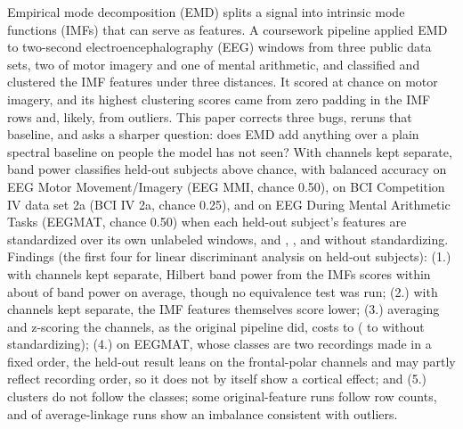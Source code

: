 Empirical mode decomposition (EMD) splits a signal into intrinsic mode functions (IMFs) that can serve as features. A coursework pipeline applied EMD to two-second electroencephalography (EEG) windows from three public data sets, two of motor imagery and one of mental arithmetic, and classified and clustered the IMF features under three distances. It scored at chance on motor imagery, and its highest clustering scores came from zero padding in the IMF rows and, likely, from outliers. This paper corrects three bugs, reruns that baseline, and asks a sharper question: does EMD add anything over a plain spectral baseline on people the model has not seen? With channels kept separate, band power classifies held-out subjects above chance, with balanced accuracy  on EEG Motor Movement/Imagery (EEG MMI, chance 0.50),  on BCI Competition IV data set 2a (BCI IV 2a, chance 0.25), and  on EEG During Mental Arithmetic Tasks (EEGMAT, chance 0.50) when each held-out subject's features are standardized over its own unlabeled windows, and , , and  without standardizing. Findings (the first four for linear discriminant analysis on held-out subjects): (1.) with channels kept separate, Hilbert band power from the IMFs scores within about  of band power on average, though no equivalence test was run; (2.) with channels kept separate, the IMF features themselves score lower; (3.) averaging and z-scoring the channels, as the original pipeline did, costs  to  ( to  without standardizing); (4.) on EEGMAT, whose classes are two recordings made in a fixed order, the held-out result leans on the frontal-polar channels and may partly reflect recording order, so it does not by itself show a cortical effect; and (5.) clusters do not follow the classes; some original-feature runs follow row counts, and  of  average-linkage runs show an imbalance consistent with outliers.
